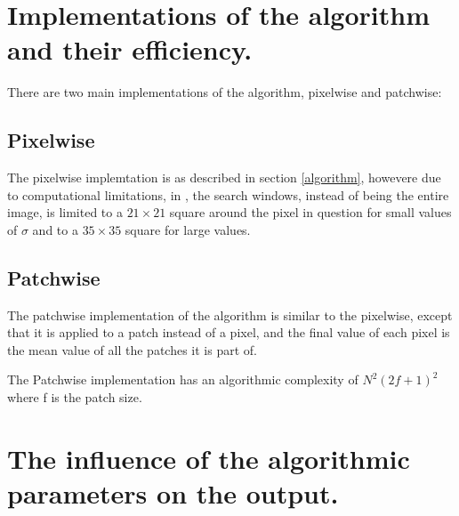 \documentclass[11pt]{article}
\begin{document}
\section{Implementations of the algorithm and their efficiency.}

There are two main implementations of the algorithm, pixelwise and patchwise:

\subsection{Pixelwise}

The pixelwise implemtation is as described in section \ref{algorithm}, howevere due to computational limitations, in \cite{Buades_2011}, the search windows, instead of being the entire image, is limited to a $21\times 21$ square around the pixel in question for small values of $\sigma$ and to a $35 \times 35$ square for large values.

\subsection{Patchwise}

The patchwise implementation of the algorithm is similar to the pixelwise, except that it is applied to a patch instead of a pixel, and the final value of each pixel is the mean value of all the patches it is part of.

The Patchwise implementation has an algorithmic complexity of $N^2(2f + 1)^2$ where f is the patch size.

\section{The influence of the algorithmic parameters on the output.}
\end{document}
